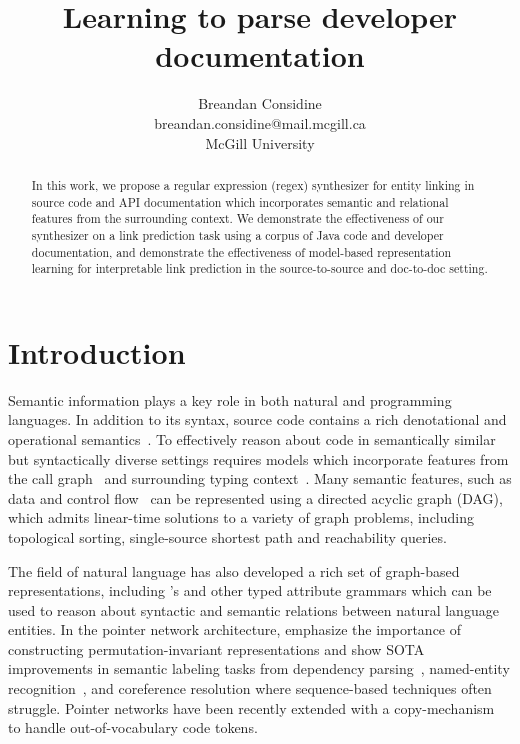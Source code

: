 \documentclass{article}
\title{Learning to parse developer documentation}
\author{Breandan Considine\\
breandan.considine@mail.mcgill.ca\\
McGill University}
\begin{document}
\maketitle

\begin{abstract}
In this work, we propose a regular expression (regex) synthesizer for entity linking in source code and API documentation which incorporates semantic and relational features from the surrounding context. We demonstrate the effectiveness of our synthesizer on a link prediction task using a corpus of Java code and developer documentation, and demonstrate the effectiveness of model-based representation learning for interpretable link prediction in the source-to-source and doc-to-doc setting.
\end{abstract}

\section{Introduction}

Semantic information plays a key role in both natural and programming languages. In addition to its syntax, source code contains a rich denotational and operational semantics~\citep{henkel2018code}. To effectively reason about code in semantically similar but syntactically diverse settings requires models which incorporate features from the call graph~\citep{gu2016deep, gu2018deep, liu2019neural} and surrounding typing context~\citep{allamanis2017learning}. Many semantic features, such as data and control flow~\citep{si2018learning} can be represented using a directed acyclic graph (DAG), which admits linear-time solutions to a variety of graph problems, including topological sorting, single-source shortest path and reachability queries.

The field of natural language has also developed a rich set of graph-based representations, including \citet{reddy2016transforming}'s and other typed attribute grammars which can be used to reason about syntactic and semantic relations between natural language entities. In the pointer network architecture, \citet{vinyals2015pointer, vinyals2015order} emphasize the importance of constructing  permutation-invariant representations and show SOTA improvements in semantic labeling tasks from dependency parsing~\citep{ma2018stack}, named-entity recognition~\citep{lample2016neural}, and coreference resolution where sequence-based techniques often struggle. Pointer networks have been recently extended with a copy-mechanism~\citep{li2017code} to handle out-of-vocabulary code tokens.
\end{document}
